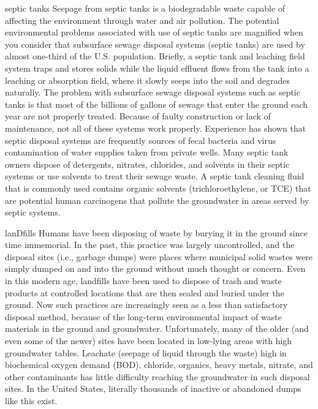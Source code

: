 \documentclass{article}
\begin{document}
septic tanks Seepage from septic tanks is a biodegradable waste capable
of affecting the environment through water and air pollution. The
potential environmental problems associated with use of septic tanks are
magnified when you consider that subsurface sewage disposal systems
(septic tanks) are used by almost one-third of the U.S. population.
Briefly, a septic tank and leaching field system traps and stores solids
while the liquid effluent flows from the tank into a leaching or
absorption field, where it slowly seeps into the soil and degrades
naturally. The problem with subsurface sewage disposal systems such as
septic tanks is that most of the billions of gallons of sewage that
enter the ground each year are not properly treated. Because of faulty
construction or lack of maintenance, not all of these systems work
properly. Experience has shown that septic disposal systems are
frequently sources of fecal bacteria and virus contamination of water
supplies taken from private wells. Many septic tank owners dispose of
detergents, nitrates, chlorides, and solvents in their septic systems or
use solvents to treat their sewage waste. A septic tank cleaning fluid
that is commonly used contains organic solvents (trichloroethylene, or
TCE) that are potential human carcinogens that pollute the groundwater
in areas served by septic systems.

lanDfills Humans have been disposing of waste by burying it in the
ground since time immemorial. In the past, this practice was largely
uncontrolled, and the disposal sites (i.e., garbage dumps) were places
where municipal solid wastes were simply dumped on and into the ground
without much thought or concern. Even in this modern age, landfills have
been used to dispose of trash and waste products at controlled locations
that are then sealed and buried under the ground. Now such practices are
increasingly seen as a less than satisfactory disposal method, because
of the long-term environmental impact of waste materials in the ground
and groundwater. Unfortunately, many of the older (and even some of the
newer) sites have been located in low-lying areas with high groundwater
tables. Leachate (seepage of liquid through the waste) high in
biochemical oxygen demand (BOD), chloride, organics, heavy metals,
nitrate, and other contaminants has little difficulty reaching the
groundwater in such disposal sites. In the United States, literally
thousands of inactive or abandoned dumps like this exist.
\end{document}
